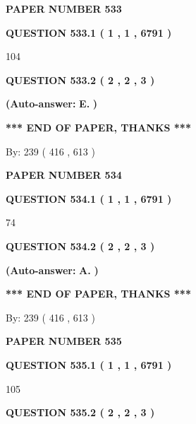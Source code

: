 \documentclass{ctexart}
\begin{document}
   
\newpage 
\setcounter{page}{ 
   533001 } 
   
   
 {\textbf{ \Large{ PAPER NUMBER  533  }}}
   
   
   
   
  
  
{\textbf{\large{QUESTION
533.1 
 ( 1 , 1 , 6791 )
}}}

104
  
  
{\textbf{\large{QUESTION
533.2 
 ( 2 , 2 , 3 )
}}}
 
 
{\textbf{(Auto-answer:}}
{\textbf{\large{
E.}}}
{\textbf{)}}
 
 
   
   
   
   
\vspace{1.0in} 
{\textbf{\large{ *** END OF PAPER, THANKS *** }}} 
   
   
\hspace{1.0in} By: 
 239 ( 416 ,  613 )
   
   
   
   
\newpage 
\setcounter{page}{ 
   534001 } 
   
   
 {\textbf{ \Large{ PAPER NUMBER  534  }}}
   
   
   
   
  
  
{\textbf{\large{QUESTION
534.1 
 ( 1 , 1 , 6791 )
}}}

74
  
  
{\textbf{\large{QUESTION
534.2 
 ( 2 , 2 , 3 )
}}}
 
 
{\textbf{(Auto-answer:}}
{\textbf{\large{
A.}}}
{\textbf{)}}
 
 
   
   
   
   
\vspace{1.0in} 
{\textbf{\large{ *** END OF PAPER, THANKS *** }}} 
   
   
\hspace{1.0in} By: 
 239 ( 416 ,  613 )
   
   
   
   
\newpage 
\setcounter{page}{ 
   535001 } 
   
   
 {\textbf{ \Large{ PAPER NUMBER  535  }}}
   
   
   
   
  
  
{\textbf{\large{QUESTION
535.1 
 ( 1 , 1 , 6791 )
}}}

105
  
  
{\textbf{\large{QUESTION
535.2 
 ( 2 , 2 , 3 )
}}}
 
\end{document}
